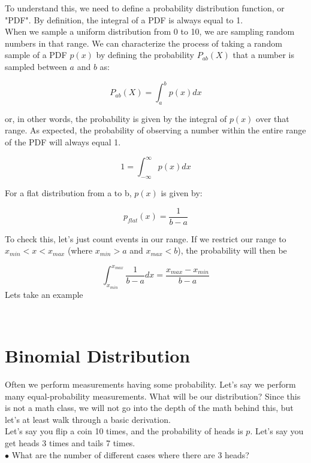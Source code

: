 \documentclass[a4paper,13pt]{report}
\begin{document}
To understand this, we need to define a probability distribution function, or "PDF". By definition, the integral of a PDF is always equal to 1. \\

When we sample a uniform distribution from 0 to 10, we are sampling random numbers in that range. We can characterize the process of taking a random sample of a PDF $p(x)$ by defining the probability $P_{ab}(X)$ that a number is sampled between $a$ and $b$ as: 

$$P_{ab}(X)=\int_{a}^{b}p(x)dx$$

or, in other words, the probability is given by the integral of $p(x)$ over that range. As expected, the probability of observing a number within the entire range of the PDF will always equal 1. 

$$1=\int_{-\infty}^{\infty}p(x)dx$$

For a flat distribution from a to b, $p(x)$ is given by:

$$p_{flat}(x)=\frac{1}{b-a}$$  

To check this, let's just count events in our range. If we restrict our range to $x_{min} < x < x_{max}$ (where $x_{min} > a$ and $x_{max} < b$), the probability will then be 

$$\int_{x_{min}}^{x_{max}}\frac{1}{b-a}dx = \frac{x_{max}-x_{min}}{b-a}$$
Lets take an example
\begin{verbatim}
	
\end{verbatim}
\section{Binomial Distribution}
Often we perform measurements having some probability. Let's say we perform many equal-probability measurements. What will be our distribution? Since this is not a math class, we will not go into the depth of the math behind this, but let's at least walk through a basic derivation.\\

Let's say you flip a coin 10 times, and the probability of heads is $p$. Let's say you get heads 3 times and tails 7 times.\\

$\bullet$ What are the number of different cases where there are 3 heads?\\
\end{document}
